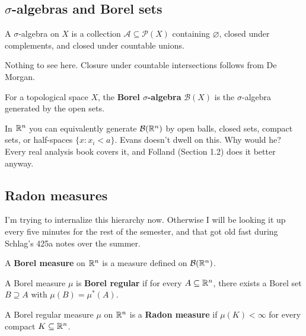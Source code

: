 \subsection{$\sigma$-algebras and Borel sets}\label{subsec:sigma-algebras}

\begin{definition}\label{def:sigma-algebra}
A $\sigma$-algebra on $X$ is a collection
$\mathcal{A} \subseteq \mathcal{P}(X)$ containing $\varnothing$, closed
under complements, and closed under countable unions.
\end{definition}

Nothing to see here. Closure under countable intersections follows from
De Morgan.

\begin{definition}\label{def:borel}
For a topological space $X$, the \textbf{Borel $\sigma$-algebra}
$\mathcal{B}(X)$ is the $\sigma$-algebra generated by the open sets.
\end{definition}

In $\mathbb{R}^n$ you can equivalently generate $\mathcal{B}(\mathbb{R}^n)$ by open balls,
closed sets, compact sets, or half-spaces $\{x : x_i < a\}$. Evans doesn't
dwell on this. Why would he? Every real analysis book covers it, and Folland (Section 1.2) does it better anyway.


\subsection{Radon measures}\label{subsec:radon}

I'm trying to internalize this hierarchy now. Otherwise I will be looking it up every five minutes for the rest of the semester, and that got old fast during Schlag's 425a notes over the summer.

\begin{definition}\label{def:borel-measure}
A \textbf{Borel measure} on $\mathbb{R}^n$ is a measure defined on
$\mathcal{B}(\mathbb{R}^n)$.
\end{definition}

\begin{definition}\label{def:borel-regular}
A Borel measure $\mu$ is \textbf{Borel regular} if for every
$A \subseteq \mathbb{R}^n$, there exists a Borel set $B \supseteq A$ with
$\mu(B) = \mu^*(A)$.
\end{definition}

\begin{definition}\label{def:radon}
A Borel regular measure $\mu$ on $\mathbb{R}^n$ is a \textbf{Radon measure} if
$\mu(K) < \infty$ for every compact $K \subseteq \mathbb{R}^n$.
\end{definition}


